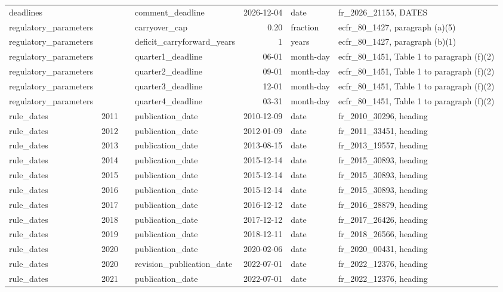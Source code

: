 \begin{longtable}{p{2.3cm}p{0.7cm}p{1.0cm}p{2.6cm}rp{1.7cm}p{4.6cm}}
deadlines &  &  & comment\_deadline & 2026-12-04 & date & fr\_2026\_21155, DATES \\
regulatory\_parameters &  &  & carryover\_cap & 0.20 & fraction & ecfr\_80\_1427, paragraph (a)(5) \\
regulatory\_parameters &  &  & deficit\_carryforward\_years & 1 & years & ecfr\_80\_1427, paragraph (b)(1) \\
regulatory\_parameters &  &  & quarter1\_deadline & 06-01 & month-day & ecfr\_80\_1451, Table 1 to paragraph (f)(2) \\
regulatory\_parameters &  &  & quarter2\_deadline & 09-01 & month-day & ecfr\_80\_1451, Table 1 to paragraph (f)(2) \\
regulatory\_parameters &  &  & quarter3\_deadline & 12-01 & month-day & ecfr\_80\_1451, Table 1 to paragraph (f)(2) \\
regulatory\_parameters &  &  & quarter4\_deadline & 03-31 & month-day & ecfr\_80\_1451, Table 1 to paragraph (f)(2) \\
rule\_dates & 2011 &  & publication\_date & 2010-12-09 & date & fr\_2010\_30296, heading \\
rule\_dates & 2012 &  & publication\_date & 2012-01-09 & date & fr\_2011\_33451, heading \\
rule\_dates & 2013 &  & publication\_date & 2013-08-15 & date & fr\_2013\_19557, heading \\
rule\_dates & 2014 &  & publication\_date & 2015-12-14 & date & fr\_2015\_30893, heading \\
rule\_dates & 2015 &  & publication\_date & 2015-12-14 & date & fr\_2015\_30893, heading \\
rule\_dates & 2016 &  & publication\_date & 2015-12-14 & date & fr\_2015\_30893, heading \\
rule\_dates & 2017 &  & publication\_date & 2016-12-12 & date & fr\_2016\_28879, heading \\
rule\_dates & 2018 &  & publication\_date & 2017-12-12 & date & fr\_2017\_26426, heading \\
rule\_dates & 2019 &  & publication\_date & 2018-12-11 & date & fr\_2018\_26566, heading \\
rule\_dates & 2020 &  & publication\_date & 2020-02-06 & date & fr\_2020\_00431, heading \\
rule\_dates & 2020 &  & revision\_publication\_date & 2022-07-01 & date & fr\_2022\_12376, heading \\
rule\_dates & 2021 &  & publication\_date & 2022-07-01 & date & fr\_2022\_12376, heading \\

\end{longtable}
